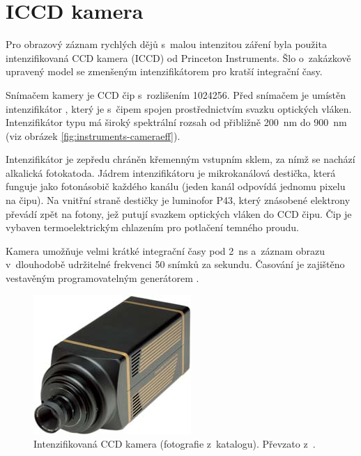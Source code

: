 \section{ICCD kamera }
\label{sec:instruments-iccd}
Pro obrazový záznam rychlých dějů s~malou intenzitou záření byla použita
intenzifikovaná CCD kamera (ICCD) od Princeton Instruments.
Šlo o~zakázkově upravený model 
se zmenšeným intenzifikátorem pro kratší integrační časy.

Snímačem kamery je CCD čip s~rozlišením \num{1024}\times\SI{256}{\pixel}.
Před snímačem je umístěn intenzifikátor ,
který je s~čipem spojen prostřednictvím svazku optických vláken.
Intenzifikátor typu  má široký spektrální rozsah
od přibližně \SI{200}{\nano\metre} do \SI{900}{\nano\metre}
(viz obrázek \ref{fig:instruments-cameraeff}).

Intenzifikátor je zepředu chráněn křemenným vstupním sklem,
za nímž se nachází alkalická fotokatoda.
Jádrem intenzifikátoru je mikrokanálová destička,
která funguje jako fotonásobič každého kanálu
(jeden kanál odpovídá jednomu pixelu na čipu).
Na vnitřní straně destičky je luminofor P43,
který znásobené elektrony převádí zpět na fotony,
jež putují svazkem optických vláken do CCD čipu.
\autocite{pi-iccd}
Čip je vybaven termoelektrickým chlazením pro potlačení temného proudu.
\autocite{pimax-datasheet}

Kamera umožňuje velmi krátké integrační časy pod \SI{2}{\nano\second}
a~záznam obrazu v~dlouhodobě udržitelné frekvenci 50 snímků za sekundu.
Časování je zajištěno vestavěným programovatelným generátorem .
\autocite{pimax-datasheet}

\begin{figure}[htp]
	\centering
	\includegraphics[scale=0.4]{img/pimax-1024}
	\caption{Intenzifikovaná CCD kamera 
		(fotografie z~katalogu).
		Převzato z~\cite{pimax-datasheet}.}
	\label{fig:instruments-camera}
\end{figure}

